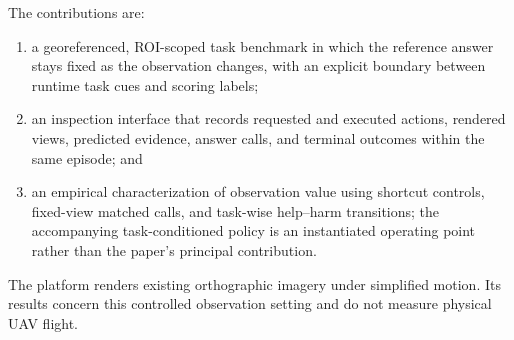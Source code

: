 The contributions are:
\begin{enumerate}
\item a georeferenced, ROI-scoped task benchmark in which the reference answer stays fixed as the observation changes, with an explicit boundary between runtime task cues and scoring labels;
\item an inspection interface that records requested and executed actions, rendered views, predicted evidence, answer calls, and terminal outcomes within the same episode; and
\item an empirical characterization of observation value using shortcut controls, fixed-view matched calls, and task-wise help--harm transitions; the accompanying task-conditioned policy is an instantiated operating point rather than the paper's principal contribution.
\end{enumerate}

The platform renders existing orthographic imagery under simplified motion. Its results concern this controlled observation setting and do not measure physical UAV flight.
